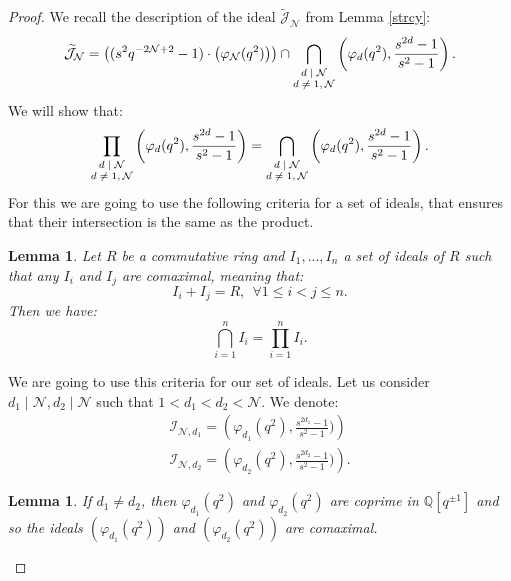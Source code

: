 \documentclass[reqno,a4paper,11pt]{amsart}
\numberwithin{equation}{section}
\numberwithin{figure}{section}
\theoremstyle{definition}
\theoremstyle{plain}
\newtheorem{lem}[defn]{Lemma}
\newcommand{\Q}{\mathbb Q}
\newcommand{\cI}{\mathcal{I}}
\newcommand{\cJ}{\mathcal{J}}
\newcommand{\cN}{\mathcal{N}}
\renewcommand{\leq}{\leqslant}
\begin{document}
\begin{proof} We recall the description of the ideal $\widetilde{\cJ}_\cN$ from Lemma \ref{strcy}:
\begin{equation*}
\widetilde{\cJ}_\cN
=\left((s^2 q^{-2\cN+2} - 1) \cdot\left(\varphi_\cN(q^2)\right)\right) \cap \bigcap_{\text{\scriptsize$\begin{matrix}
 d\mid \cN \\ d \neq 1, \cN \end{matrix}$}}
 \left(\varphi_d(q^2), \frac{s^{2d}-1}{s^2-1} \right).
\end{equation*}
We will show that:
\begin{equation*}
 \prod_{\text{\scriptsize$\begin{matrix}
 d\mid \cN \\ d \neq 1, \cN \end{matrix}$}}
 \left(\varphi_d(q^2),\frac{s^{2d}-1}{s^2-1} \right)
=
 \bigcap_{\text{\scriptsize$\begin{matrix}
 d\mid \cN \\ d \neq 1, \cN \end{matrix}$}}
 \left(\varphi_d(q^2),\frac{s^{2d}-1}{s^2-1} \right).
\end{equation*}
For this we are going to use the following criteria for a set of ideals, that ensures that their intersection is the same as the product. 
%
\begin{lem}
Let $R$ be a commutative ring and $I_1,...,I_n$ a set of ideals of $R$ such that any $I_i$ and $I_j$ are comaximal, meaning that:
$$I_i+I_j=R, \ \ \forall 1\leq i<j\leq n.$$
Then we have:
\begin{equation*}
\bigcap_{i=1}^n I_i=\prod_{i=1}^n I_i.
\end{equation*}
\end{lem}
We are going to use this criteria for our set of ideals. Let us consider $d_1\mid \cN, d_2\mid \cN$ such that $  1<d_1<d_2<\cN$.
We denote:
\begin{equation*}
\begin{aligned}
 \cI_{\cN,d_1}=\left(\varphi_{d_1}(q^2), \frac{s^{2d_1}-1}{s^2-1} )\right)\\
 \cI_{\cN,d_2}=\left(\varphi_{d_2}(q^2), \frac{s^{2d_2}-1}{s^2-1} )\right).
\end{aligned}
\end{equation*}
%
\begin{lem}\label{comax}
If $d_1 \neq d_2$, then $\varphi_{d_1}(q^2)$ and $\varphi_{d_2}(q^2)$ are coprime in $\Q[q^{\pm1}]$ and so the ideals $\left(\varphi_{d_1}(q^2)\right)$ and $\left(\varphi_{d_2}(q^2)\right)$ are comaximal.

\end{lem}
\end{proof}
\end{document}
